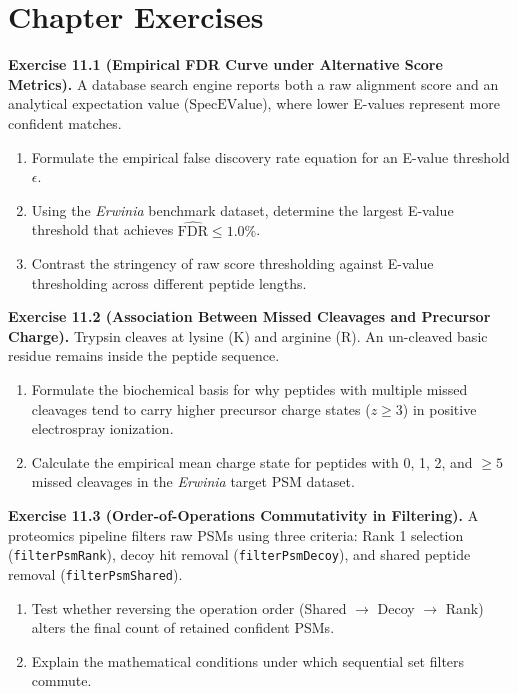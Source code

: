 \documentclass[11pt,twoside,openright]{book}
\begin{document}
\FloatBarrier

\section{Chapter Exercises}

\noindent\textbf{Exercise 11.1 (Empirical FDR Curve under Alternative Score Metrics).}\enspace
\label{ex:fdr_evalue}
A database search engine reports both a raw alignment score and an analytical expectation value ($\text{SpecEValue}$), where lower E-values represent more confident matches.
\begin{enumerate}
    \item Formulate the empirical false discovery rate equation for an E-value threshold $\epsilon$.
    \item Using the \textit{Erwinia} benchmark dataset, determine the largest E-value threshold that achieves $\widehat{\text{FDR}} \le 1.0\%$.
    \item Contrast the stringency of raw score thresholding against E-value thresholding across different peptide lengths.
\end{enumerate}

\vspace{0.8em}
\noindent\textbf{Exercise 11.2 (Association Between Missed Cleavages and Precursor Charge).}\enspace
\label{ex:missed_cleavages_charge}
Trypsin cleaves at lysine ($\text{K}$) and arginine ($\text{R}$). An un-cleaved basic residue remains inside the peptide sequence.
\begin{enumerate}
    \item Formulate the biochemical basis for why peptides with multiple missed cleavages tend to carry higher precursor charge states ($z \ge 3$) in positive electrospray ionization.
    \item Calculate the empirical mean charge state for peptides with 0, 1, 2, and $\ge 5$ missed cleavages in the \textit{Erwinia} target PSM dataset.
\end{enumerate}

\vspace{0.8em}
\noindent\textbf{Exercise 11.3 (Order-of-Operations Commutativity in Filtering).}\enspace
\label{ex:filter_commutativity}
A proteomics pipeline filters raw PSMs using three criteria: Rank 1 selection (\texttt{filterPsmRank}), decoy hit removal (\texttt{filterPsmDecoy}), and shared peptide removal (\texttt{filterPsmShared}).
\begin{enumerate}
    \item Test whether reversing the operation order (Shared $\to$ Decoy $\to$ Rank) alters the final count of retained confident PSMs.
    \item Explain the mathematical conditions under which sequential set filters commute.
\end{enumerate}
\end{document}
